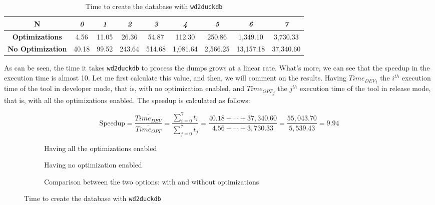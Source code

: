 \begin{table}[ht]
    \centering
    \begin{tabular}{|c|c|c|c|c|c|c|c|c|}
        \hline
        \rowcolor[HTML]{EFEFEF}
        \cellcolor[HTML]{C0C0C0}\textbf{N}               & \textit{0} & \textit{1} & \textit{2} & \textit{3} & \textit{4} & \textit{5} & \textit{6} & \textit{7} \\ \hline
        \cellcolor[HTML]{C0C0C0}\textbf{Optimizations}   & 4.56       & 11.05      & 26.36      & 54.87      & 112.30     & 250.86     & 1,349.10   & 3,730.33   \\ \hline
        \cellcolor[HTML]{C0C0C0}\textbf{No Optimization} & 40.18      & 99.52      & 243.64     & 514.68     & 1,081.64   & 2,566.25   & 13,157.18  & 37,340.60  \\ \hline
    \end{tabular}
    \caption{Time to create the database with \texttt{wd2duckdb}}
    \label{table:wd2duckdb}
\end{table}

As can be seen, the time it takes \texttt{wd2duckdb} to process the dumps grows at a linear rate. What's more, we can see that the speedup in the execution time is almost 10. Let me first calculate this value, and then, we will comment on the results. Having ${Time_{DEV}}_i$ the $i^{th}$ execution time of the tool in developer mode, that is, with no optimization enabled, and ${Time_{OPT}}_j$ the $j^{th}$ execution time of the tool in release mode, that is, with all the optimizations enabled. The speedup is calculated as follows:

\begin{equation}
    \text{Speedup} = \frac{\overline{Time_{DEV}}}{\overline{Time_{OPT}}} = \frac{\sum_{i=0}^{7}t_i}{\sum_{j=0}^{7}t_j} = \frac{40.18 + \cdots + 37,340.60}{4.56 + \cdots + 3,730.33} = \frac{55,043.70}{5,539.43} = 9.94
\end{equation}

\begin{figure}[p]
    \begin{subfigure}{0.49\textwidth}
        \centering
        
        \caption{Having all the optimizations enabled}
    \end{subfigure}%
    \hfill
    \begin{subfigure}{0.49\textwidth}
        \centering
        
        \caption{Having no optimization enabled}
    \end{subfigure}%
    \vspace*{1em}
    \begin{subfigure}{\textwidth}
        \centering
        
        \caption{Comparison between the two options: with and without optimizations}
    \end{subfigure}
    \caption{Time to create the database with \texttt{wd2duckdb}}
    \label{fig:wd2duckdb}
\end{figure}

